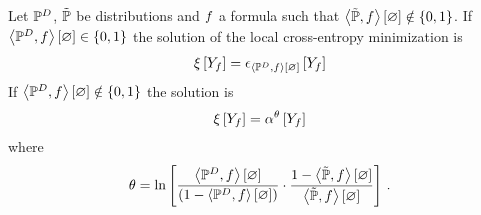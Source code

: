 \begin{lemma}
    \label{lem:localHybridParamUpdate}
    Let $\mathbb{P}^{D}$, $\tilde{\mathbb{P}}$ be distributions and $f$ a formula such that $\left\langle \tilde{\mathbb{P}},f\right\rangle \left[ \varnothing \right]\notin\{0,1\}$.
    If $\left\langle \mathbb{P}^{D},f\right\rangle \left[ \varnothing \right]\in\{0,1\}$ the solution of the local cross-entropy minimization is
    \begin{align*}
        \xi\left[Y_{f}\right] = \epsilon_{\left\langle \mathbb{P}^{D},f\right\rangle \left[ \varnothing \right]}\left[Y_{f}\right]
    \end{align*}
    If $\left\langle \mathbb{P}^{D},f\right\rangle \left[ \varnothing \right]\notin\{0,1\}$ the solution is
    \begin{align*}
        \xi\left[Y_{f}\right] = \alpha^\theta\left[Y_{f}\right]
    \end{align*}
    where
    \begin{align*}
        \theta = \ln \left[ 
            \frac{\left\langle \mathbb{P}^{D},f\right\rangle \left[ \varnothing \right]}{(1-\left\langle \mathbb{P}^{D},f\right\rangle \left[ \varnothing \right])}
            \cdot \frac{1-\left\langle \tilde{\mathbb{P}},f\right\rangle \left[ \varnothing \right]}{\left\langle \tilde{\mathbb{P}},f\right\rangle \left[ \varnothing \right]}
         \right] \, .
    \end{align*}
\end{lemma}
